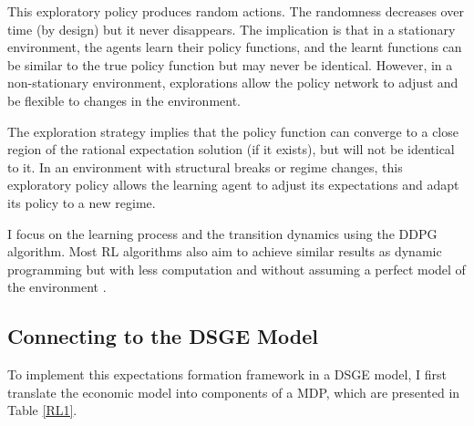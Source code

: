\documentclass[hidelinks]{article}
\begin{document}
This exploratory policy produces random actions. The randomness decreases over time (by design) but it never disappears. The implication is that in a stationary environment, the agents learn their policy functions, and the learnt functions can be similar to the true policy function but may never be identical. However, in a non-stationary environment, explorations allow the policy network to adjust and be flexible to changes in the environment. 

The exploration strategy implies that the policy function can converge to a close region of the rational expectation solution (if it exists), but will not be identical to it. In an environment with structural breaks or regime changes, this exploratory policy allows the learning agent to adjust its expectations and adapt its policy to a new regime.

I focus on the learning process and the transition dynamics using the DDPG algorithm. Most RL algorithms also aim to achieve similar results as dynamic programming but with less computation and without assuming a perfect model of the environment \citep{SB2018}. 


\subsection{Connecting to the DSGE Model}

To implement this expectations formation framework in a DSGE model, I first translate the economic model into components of a MDP, which are presented in Table \ref{RL1}.



 
\end{document}

